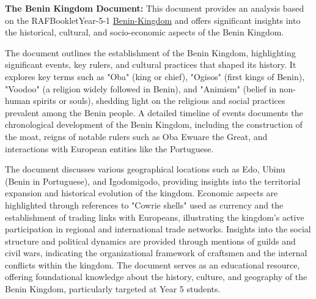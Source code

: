 \noindent\textbf{The Benin Kingdom Document:}
This document provides an analysis based on the RAFBookletYear-5-1 \href{https://denhamgreenacademy.e-act.org.uk/wp-content/uploads/sites/5/2020/10/RAFBookletYear-5-1Benin-Kingdom-paper-size-297x21-cmUPDATED.210187322-wecompress.com_.pdf}{Benin-Kingdom} and offers significant insights into the historical, cultural, and socio-economic aspects of the Benin Kingdom.

The document outlines the establishment of the Benin Kingdom, highlighting significant events, key rulers, and cultural practices that shaped its history. It explores key terms such as "Oba" (king or chief), "Ogisos" (first kings of Benin), "Voodoo" (a religion widely followed in Benin), and "Animism" (belief in non-human spirits or souls), shedding light on the religious and social practices prevalent among the Benin people. A detailed timeline of events documents the chronological development of the Benin Kingdom, including the construction of the moat, reigns of notable rulers such as Oba Ewuare the Great, and interactions with European entities like the Portuguese.

The document discusses various geographical locations such as Edo, Ubinu (Benin in Portuguese), and Igodomigodo, providing insights into the territorial expansion and historical evolution of the kingdom. Economic aspects are highlighted through references to "Cowrie shells" used as currency and the establishment of trading links with Europeans, illustrating the kingdom's active participation in regional and international trade networks. Insights into the social structure and political dynamics are provided through mentions of guilds and civil wars, indicating the organizational framework of craftsmen and the internal conflicts within the kingdom. The document serves as an educational resource, offering foundational knowledge about the history, culture, and geography of the Benin Kingdom, particularly targeted at Year 5 students.

